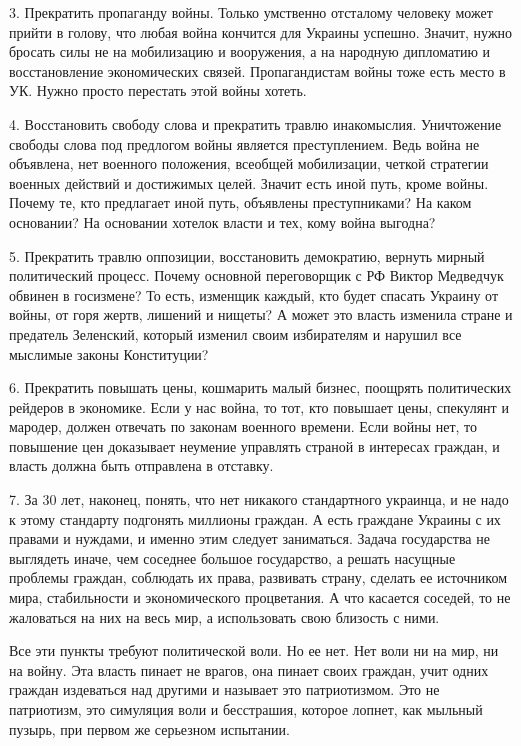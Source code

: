 3. Прекратить пропаганду войны. Только умственно отсталому человеку может
прийти в голову, что любая война кончится для Украины успешно. Значит, нужно
бросать силы не на мобилизацию и вооружения, а на народную дипломатию и
восстановление экономических связей. Пропагандистам войны тоже есть место в УК.
Нужно просто перестать этой войны хотеть. 

4. Восстановить свободу слова и прекратить травлю инакомыслия. Уничтожение
свободы слова под предлогом войны является преступлением. Ведь война не
объявлена, нет военного положения, всеобщей мобилизации, четкой стратегии
военных действий и достижимых целей. Значит есть иной путь, кроме войны. Почему
те, кто предлагает иной путь, объявлены преступниками?  На каком основании? На
основании хотелок власти и тех, кому война выгодна?

5. Прекратить травлю оппозиции, восстановить демократию, вернуть мирный
политический процесс. Почему основной переговорщик с РФ Виктор Медведчук
обвинен в госизмене? То есть, изменщик каждый, кто будет спасать Украину от
войны, от горя жертв, лишений и нищеты? А может это власть изменила стране и
предатель Зеленский, который изменил своим избирателям и нарушил все мыслимые
законы Конституции?

6. Прекратить повышать цены, кошмарить малый бизнес, поощрять политических
рейдеров в экономике. Если у нас война, то тот, кто повышает цены, спекулянт и
мародер, должен   отвечать по законам военного времени. Если войны нет, то
повышение цен доказывает неумение управлять страной в интересах граждан, и
власть должна быть отправлена в отставку. 

7. За 30 лет, наконец, понять, что нет никакого стандартного украинца, и не
надо к этому стандарту подгонять миллионы граждан. А есть граждане Украины с их
правами и нуждами, и именно этим следует заниматься. Задача государства не
выглядеть иначе, чем соседнее большое государство, а решать насущные проблемы
граждан, соблюдать их права, развивать страну, сделать ее источником мира,
стабильности и экономического процветания. А что касается соседей, то не
жаловаться на них на весь мир, а использовать свою близость с ними. 

Все эти пункты требуют политической воли. Но ее нет. Нет воли ни на мир, ни на
войну. Эта власть пинает не врагов, она пинает своих граждан, учит одних
граждан издеваться над другими и называет это патриотизмом. Это не патриотизм,
это симуляция воли и бесстрашия, которое лопнет, как мыльный пузырь, при первом
же серьезном испытании.
